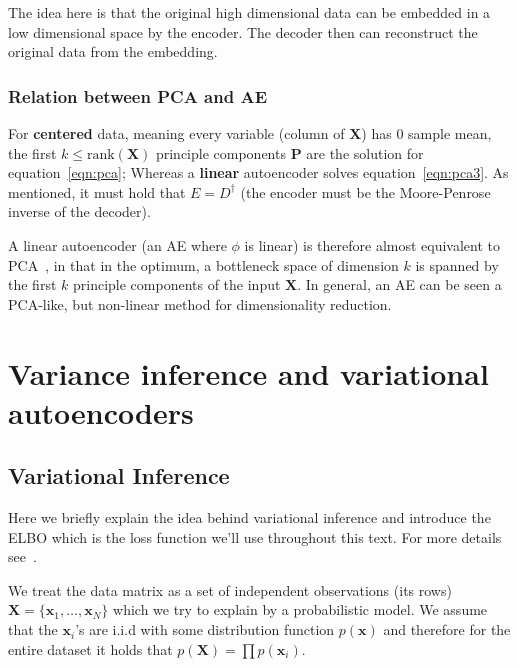 \documentclass[11pt, a4paper]{report}
\theoremstyle{plain}
\theoremstyle{definition}
\theoremstyle{remark}
\newcommand{\bv}[1]{\boldsymbol{#1}}
\begin{document}
The idea here is that the original high dimensional data can be embedded
in a low dimensional space by the encoder. The decoder then can reconstruct the
original data from the embedding.



\subsection{Relation between PCA and AE}
For \textbf{centered} data, meaning every variable (column of $\bv{X}$)
has $0$ sample mean, the first $k \leq \text{rank}(\bv{X})$ principle components
$\bv{P}$ are the solution for equation~\ref{eqn:pca}; Whereas a \textbf{linear}
autoencoder solves equation~\ref{eqn:pca3}. As mentioned, it must hold that $E =
D^{\dagger}$ (the encoder must be the Moore-Penrose inverse of the decoder).

A linear autoencoder (an AE where $\phi$ is linear) is therefore almost equivalent to
PCA~\cite{plaut2018principal}, in that in the optimum, a bottleneck space of dimension $k$
is spanned by the first $k$ principle components of the input $\bv{X}$.
In general, an AE can be seen a PCA-like, but non-linear method for
dimensionality reduction.

\chapter{Variance inference and variational autoencoders}
\section{Variational Inference}

Here we briefly explain the idea behind variational inference and introduce the
ELBO which is the loss function we'll use throughout this text.
For more details see~.

We treat the data matrix as a set of independent observations (its rows)
$\bv{X} = \{\bv{x}_1, \dots
, \bv{x}_N\}$ which we try to explain by a probabilistic model. 
We assume that
the $\bv{x}_i$'s are i.i.d with some distribution function $p(\bv{x})$ and therefore for
the entire dataset it holds that $p(\bv{X}) = \prod p(\bv{x}_i)$.
\end{document}
